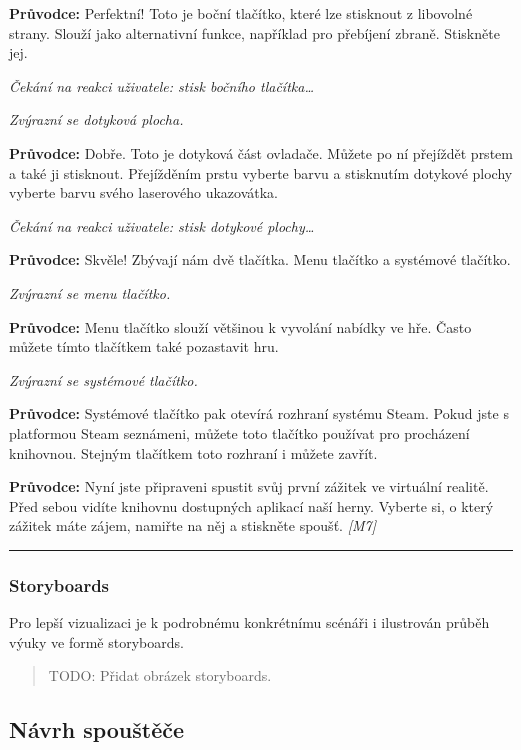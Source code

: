 \textbf{Průvodce:} Perfektní! Toto je boční tlačítko, které lze
stisknout z libovolné strany. Slouží jako alternativní funkce, například
pro přebíjení zbraně. Stiskněte jej.

\emph{Čekání na reakci uživatele: stisk bočního tlačítka\ldots{}}

\emph{Zvýrazní se dotyková plocha.}

\textbf{Průvodce:} Dobře. Toto je dotyková část ovladače. Můžete po ní
přejíždět prstem a také ji stisknout. Přejížděním prstu vyberte barvu a
stisknutím dotykové plochy vyberte barvu svého laserového ukazovátka.

\emph{Čekání na reakci uživatele: stisk dotykové plochy\ldots{}}

\textbf{Průvodce:} Skvěle! Zbývají nám dvě tlačítka. Menu tlačítko a
systémové tlačítko.

\emph{Zvýrazní se menu tlačítko.}

\textbf{Průvodce:} Menu tlačítko slouží většinou k vyvolání nabídky ve
hře. Často můžete tímto tlačítkem také pozastavit hru.

\emph{Zvýrazní se systémové tlačítko.}

\textbf{Průvodce:} Systémové tlačítko pak otevírá rozhraní systému
Steam. Pokud jste s platformou Steam seznámeni, můžete toto tlačítko
používat pro procházení knihovnou. Stejným tlačítkem toto rozhraní i
můžete zavřít.

\textbf{Průvodce:} Nyní jste připraveni spustit svůj první zážitek ve
virtuální realitě. Před sebou vidíte knihovnu dostupných aplikací naší
herny. Vyberte si, o který zážitek máte zájem, namiřte na něj a
stiskněte spoušť. \emph{{[}M7{]}}

\begin{center}\rule{0.5\linewidth}{\linethickness}\end{center}

\subsubsection{Storyboards}\label{storyboards}

Pro lepší vizualizaci je k podrobnému konkrétnímu scénáři i ilustrován
průběh výuky ve formě storyboards.

\begin{quote}
TODO: Přidat obrázek storyboards.
\end{quote}

\subsection{Návrh spouštěče}\label{nuxe1vrh-spouux161tux11bux10de}

